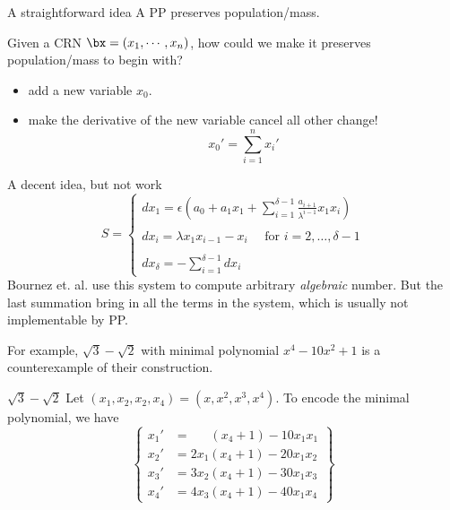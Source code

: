 \documentclass[aspectratio=169]{beamer}
\begin{document}
\begin{frame}{A straightforward idea}
    A PP preserves population/mass.

    \begin{quest}
        Given a CRN $\bx=(x_1,\cdots, x_n)$, how could we make it preserves population/mass to begin with?
    \end{quest}\pause
    \begin{itemize}
        \item add a new variable $x_0$. \pause
        \item make the derivative of the new variable cancel all other change!
        \[
            x_0' = \sum_{i=1}^{n}x_i'
        \]
    \end{itemize}
\end{frame}
\begin{frame}[Clean]{A decent idea, but not work}
    $$ S= \begin{cases} dx_1 = \epsilon (a_0 + a_1 x_1 +\sum_{i=1}^{\delta-1}\frac{a_{i+1}}{\lambda^{i-1}}x_1x_i) \\ \\  dx_i = \lambda x_1 x_{i-1}-x_i \quad\text{ for } i=2,\dots,\delta-1           \\ \\ dx_\delta = -\sum_{i=1}^{\delta-1}dx_i \end{cases}$$\pause
    Bournez et. al. use this system to compute arbitrary \emph{algebraic} number. But the last summation bring in all the terms in the system, which is usually not implementable by PP.

    For example, $\sqrt{3}-\sqrt{2} $ with minimal polynomial $x^4-10x^2+1$ is a counterexample of their construction.
\end{frame}
\begin{frame}{$\sqrt{3}-\sqrt{2}$ }
    Let $(x_1,x_2,x_2,x_4)=(x,x^2,x^3,x^4)$. To encode the minimal polynomial, we have
    \[
        \left\{\begin{matrix}
x_1' &=  \;\;\;\;\;\, (x_4+1) - 10 x_1x_1
\\
x_2'&=  2x_1 ( x_4 + 1) -20x_1x_2
\\
x_3 ' &=  3x_2 ( x_4 + 1) -30x_1x_3
\\
x_4'  &=  4x_3 ( x_4 + 1) -40x_1x_4
\end{matrix}\right\}
    \]
\end{frame}
\end{document}
